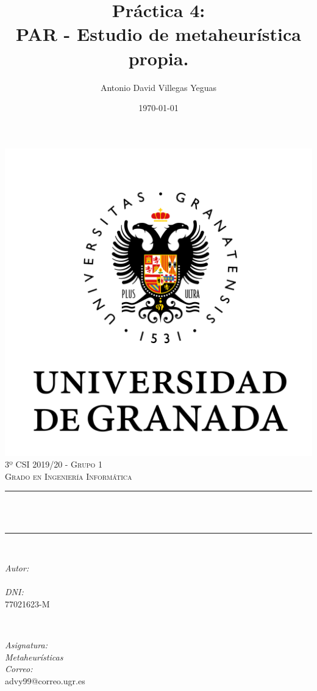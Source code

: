 \documentclass[12pt, spanish]{article}
\title{Práctica 4:\\
PAR - Estudio de metaheurística propia.  \hspace{0.05cm} }
\author{Antonio David Villegas Yeguas}
\date{\today}
\makeatletter
\let\thetitle\@title
\let\theauthor\@author
\makeatother
\begin{document}

\begin{titlepage}
    \centering
    \vspace*{0.3 cm}
    \includegraphics[scale = 0.50]{ugr.png}\\[0.7 cm]
    \textsc{\large 3º CSI 2019/20 - Grupo 1}\\[0.5 cm]
    \textsc{\large Grado en Ingeniería Informática}\\[0.5 cm]
    \rule{\linewidth}{0.2 mm} \\[0.2 cm]
    { \huge \bfseries \thetitle}\\
    \rule{\linewidth}{0.2 mm} \\[1 cm]

    \begin{minipage}{0.4\textwidth}
        \begin{flushleft} \large
            \emph{Autor:}\\
            \theauthor\\
			 \emph{DNI:}\\
            77021623-M
            \end{flushleft}
            \end{minipage}~
            \begin{minipage}{0.4\textwidth}
            \begin{flushright} \large
            \emph{Asignatura: \\
            Metaheurísticas}   \\
            \emph{Correo:}\\
            advy99@correo.ugr.es
        \end{flushright}
    \end{minipage}\\[0.5cm]


\end{titlepage}
\end{document}
